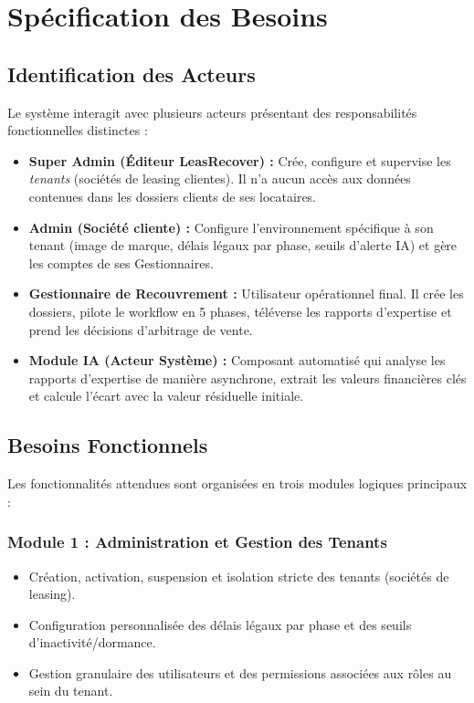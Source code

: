 \section{Spécification des Besoins}

\subsection{Identification des Acteurs}

Le système interagit avec plusieurs acteurs présentant des responsabilités fonctionnelles distinctes :
\begin{itemize}
    \item \textbf{Super Admin (Éditeur LeasRecover) :} Crée, configure et supervise les \textit{tenants} (sociétés de leasing clientes). Il n'a aucun accès aux données contenues dans les dossiers clients de ses locataires.
    \item \textbf{Admin (Société cliente) :} Configure l'environnement spécifique à son tenant (image de marque, délais légaux par phase, seuils d'alerte IA) et gère les comptes de ses Gestionnaires.
    \item \textbf{Gestionnaire de Recouvrement :} Utilisateur opérationnel final. Il crée les dossiers, pilote le workflow en 5 phases, téléverse les rapports d'expertise et prend les décisions d'arbitrage de vente.
    \item \textbf{Module IA (Acteur Système) :} Composant automatisé qui analyse les rapports d'expertise de manière asynchrone, extrait les valeurs financières clés et calcule l'écart avec la valeur résiduelle initiale.
\end{itemize}

\subsection{Besoins Fonctionnels}

Les fonctionnalités attendues sont organisées en trois modules logiques principaux :

\subsubsection{Module 1 : Administration et Gestion des Tenants}
\begin{itemize}
    \item Création, activation, suspension et isolation stricte des tenants (sociétés de leasing).
    \item Configuration personnalisée des délais légaux par phase et des seuils d'inactivité/dormance.
    \item Gestion granulaire des utilisateurs et des permissions associées aux rôles au sein du tenant.
\end{itemize}

